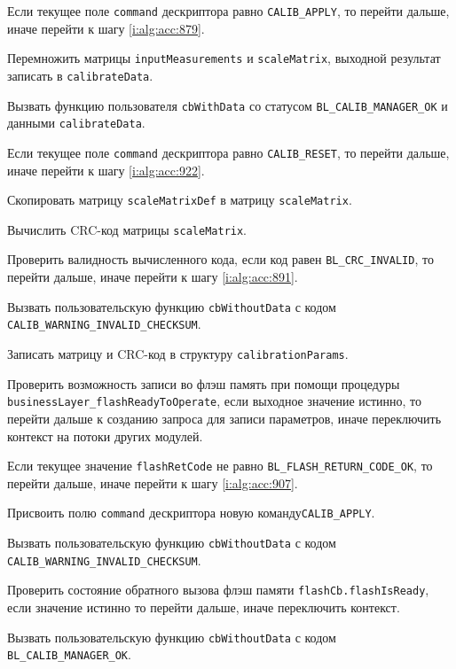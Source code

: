 \begin{enumerate_step}
    \item \label{i:alg:acc:866} Если текущее поле \lstinline|command| дескриптора равно \lstinline|CALIB_APPLY|, то перейти дальше, иначе перейти к шагу
    \ref{i:alg:acc:879}.
    \item Перемножить матрицы \lstinline|inputMeasurements| и \lstinline|scaleMatrix|, выходной результат записать в \lstinline|calibrateData|.
    \item Вызвать функцию пользователя \lstinline|cbWithData| со статусом \lstinline|BL_CALIB_MANAGER_OK| и данными \lstinline|calibrateData|.
    \item \label{i:alg:acc:879} Если текущее поле \lstinline|command| дескриптора равно \lstinline|CALIB_RESET|, то перейти дальше, иначе перейти к шагу
    \ref{i:alg:acc:922}.
    \item Скопировать матрицу \lstinline|scaleMatrixDef| в матрицу \lstinline|scaleMatrix|.
    \item Вычислить CRC-код матрицы \lstinline|scaleMatrix|.
    \item Проверить валидность вычисленного кода, если код равен \lstinline|BL_CRC_INVALID|, то перейти дальше, иначе перейти к шагу \ref{i:alg:acc:891}.
    \item Вызвать пользовательскую функцию \lstinline|cbWithoutData| с кодом \lstinline|CALIB_WARNING_INVALID_CHECKSUM|.
    \item \label{i:alg:acc:891} Записать матрицу и CRC-код в структуру \lstinline|calibrationParams|.
    \item Проверить возможность записи во флэш память при помощи процедуры \lstinline|businessLayer_flashReadyToOperate|, если выходное значение истинно, то перейти дальше к созданию запроса для записи параметров, иначе переключить контекст на потоки других модулей.
    \item Если текущее значение \lstinline|flashRetCode| не равно \lstinline|BL_FLASH_RETURN_CODE_OK|, то перейти дальше, иначе перейти к шагу
    \ref{i:alg:acc:907}.
    \item Присвоить полю \lstinline|command| дескриптора  новую команду\lstinline|CALIB_APPLY|.
    \item \label{i:alg:acc:903} Вызвать пользовательскую функцию \lstinline|cbWithoutData| с кодом \lstinline|CALIB_WARNING_INVALID_CHECKSUM|.
    \item \label{i:alg:acc:907} Проверить состояние обратного вызова флэш памяти \lstinline|flashCb.flashIsReady|, если значение истинно то перейти дальше, иначе переключить контекст.
    \item Вызвать пользовательскую функцию \lstinline|cbWithoutData| с кодом \lstinline|BL_CALIB_MANAGER_OK|.
    

\end{enumerate_step}
